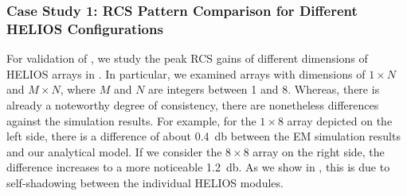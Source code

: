 \subsubsection{Case Study 1: RCS Pattern Comparison for Different HELIOS Configurations}
For validation of , we study the peak RCS gains of different dimensions of HELIOS arrays in . In particular, we examined arrays with dimensions of $\num{1}\times N$ and $M\times N$, where $M$ and $N$ are integers between \num{1} and \num{8}. Whereas, there is already a noteworthy degree of consistency, there are nonetheless differences against the simulation results. For example, for the $\num{1}\times \num{8}$ array depicted on the left side, there is a difference of about \SI{0.4}{\decibel} between the EM simulation results and our analytical model. If we consider the $\num{8}\times \num{8}$ array on the right side, the difference increases to a more noticeable \SI{1.2}{\decibel}. As we show in , this is due to self-shadowing between the individual HELIOS modules.

